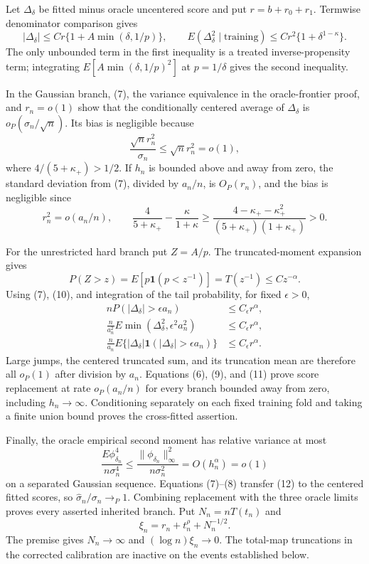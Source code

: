 Let \(\Delta_\delta\) be fitted minus oracle uncentered score and put \(r=b+r_0+r_1\).  Termwise denominator comparison gives
\[
 |\Delta_\delta|\leq Cr\{1+A\min(\delta,1/p)\},\qquad
 E(\Delta_\delta^2\mid\text{training})\leq Cr^2\{1+\delta^{1-\kappa}\}. \tag{7}
\]
The only unbounded term in the first inequality is a treated inverse-propensity term; integrating
\(E[A\min(\delta,1/p)^2]\) at \(p=1/\delta\) gives the second inequality.

In the Gaussian branch, (7), the variance equivalence in the oracle-frontier proof, and \(r_n=o(1)\) show that the conditionally centered average of \(\Delta_\delta\) is \(o_P(\sigma_n/\sqrt n)\).  Its bias is negligible because
\[
 \frac{\sqrt n r_n^2}{\sigma_n}\leq\sqrt n r_n^2=o(1), \tag{8}
\]
where \(4/(5+\kappa_+)>1/2\).  If \(h_n\) is bounded above and away from zero, the standard deviation from (7), divided by \(a_n/n\), is \(O_P(r_n)\), and the bias is negligible since
\[
 r_n^2=o(a_n/n),\qquad
 \frac4{5+\kappa_+}-\frac{\kappa}{1+\kappa}
 \geq\frac{4-\kappa_+-\kappa_+^2}{(5+\kappa_+)(1+\kappa_+)}>0. \tag{9}
\]

For the unrestricted hard branch put \(Z=A/p\).  The truncated-moment expansion gives
\[
 P(Z>z)=E[p\mathbf1(p<z^{-1})]=T(z^{-1})\leq Cz^{-\alpha}. \tag{10}
\]
Using (7), (10), and integration of the tail probability, for fixed \(\epsilon>0\),
\[
\begin{split}
 nP(|\Delta_\delta|>\epsilon a_n)&\leq C_\epsilon r^\alpha,\\
 \frac n{a_n^2}E\min(\Delta_\delta^2,\epsilon^2a_n^2)&\leq C_\epsilon r^\alpha,\\
 \frac n{a_n}E\{|\Delta_\delta|\mathbf1(|\Delta_\delta|>\epsilon a_n)\}&\leq C_\epsilon r^\alpha.
\end{split} \tag{11}
\]
Large jumps, the centered truncated sum, and its truncation mean are therefore all \(o_P(1)\) after division by \(a_n\).  Equations (6), (9), and (11) prove score replacement at rate \(o_P(a_n/n)\) for every branch bounded away from zero, including \(h_n\to\infty\).  Conditioning separately on each fixed training fold and taking a finite union bound proves the cross-fitted assertion.

Finally, the oracle empirical second moment has relative variance at most
\[
 \frac{E\phi_{\delta_n}^4}{n\sigma_n^4}
 \leq\frac{\|\phi_{\delta_n}\|_\infty^2}{n\sigma_n^2}
 =O(h_n^\alpha)=o(1) \tag{12}
\]
on a separated Gaussian sequence.  Equations (7)--(8) transfer (12) to the centered fitted scores, so \(\widehat\sigma_n/\sigma_n\to_P1\).  Combining replacement with the three oracle limits proves every asserted inherited branch.
Put \(N_n=nT(t_n)\) and
\[
 \xi_n=r_n+t_n^\rho+N_n^{-1/2}.
\]
The premise gives \(N_n\to\infty\) and \((\log n)\xi_n\to0\).  The total-map truncations in the corrected calibration are inactive on the events established below.

